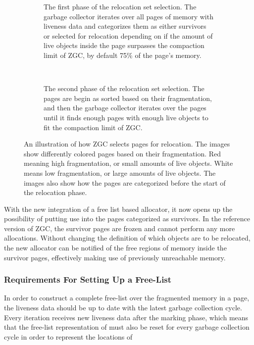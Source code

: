 \begin{figure}[H]
    \centering
    \begin{subfigure}[b]{0.6\textwidth}
        
        \caption{The first phase of the relocation set selection. The garbage collector iterates over all pages of memory with liveness data and categorizes them as either survivors or selected for relocation depending on if the amount of live objects inside the page surpasses the compaction limit of ZGC, by default 75\% of the page's memory.}
        \label{fig:rel_set_selector1}
    \end{subfigure}
    \\
    \begin{subfigure}[b]{0.6\textwidth}
        
        \caption{The second phase of the relocation set selection. The pages are begin as sorted based on their fragmentation, and then the garbage collector iterates over the pages until it finds enough pages with enough live objects to fit the compaction limit of ZGC.}
        \label{fig:rel_set_selector2}
    \end{subfigure}
    \caption{An illustration of how ZGC selects pages for relocation. The images show differently colored pages based on their fragmentation. Red meaning high fragmentation, or small amounts of live objects. White means low fragmentation, or large amounts of live objects. The images also show how the pages are categorized before the start of the relocation phase.}
    \label{fig:rel_set_selector}
\end{figure} 

With the new integration of a free list based allocator, it now opens up the possibility of putting use into the pages categorized as survivors. In the reference version of ZGC, the survivor pages are frozen and cannot perform any more allocations. Without changing the definition of which objects are to be relocated, the new allocator can be notified of the free regions of memory inside the survivor pages, effectively making use of previously unreachable memory.

\subsubsection{Requirements For Setting Up a Free-List}
\label{sec:analyse-init}
In order to construct a complete free-list over the fragmented memory in a page, the liveness data should be up to date with the latest garbage collection cycle. Every iteration receives new liveness data after the marking phase, which means that the free-list representation of must also be reset for every garbage collection cycle in order to represent the locations of 

